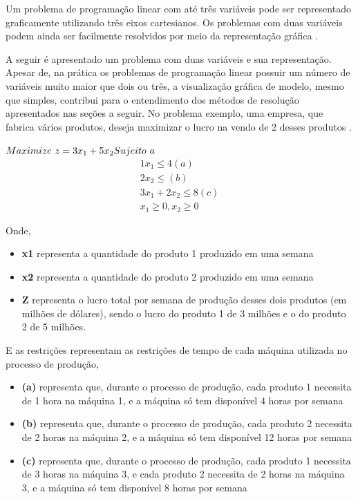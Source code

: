 Um problema de programação linear com até três variáveis pode ser representado graficamente utilizando três eixos cartesianos. Os problemas com duas variáveis podem ainda ser facilmente resolvidos por meio da representação gráfica \cite{Passos}. 

A seguir é apresentado um problema com duas variáveis e sua representação. Apesar de, na prática os problemas de programação linear possuir um número de variáveis muito maior que dois ou três, a visualização gráfica de modelo, mesmo que simples, contribui para o entendimento dos métodos de resolução apresentados nas seções a seguir.
No problema exemplo, uma empresa, que fabrica vários produtos, deseja maximizar o lucro na vendo de 2 desses produtos \cite{Hillier}.

$\\Maximize\ z=3x_{1}+5x_{2}\\
Sujeito\ a\\$
\begin{eqnarray*}
        1x_{1}\leq 4 (a)\\
              2x_{2}\leq (b)\\
        3x_{1}+2x_{2}\leq 8 (c)\\
         x_{1}\geq 0, x_{2}\geq 0
\end{eqnarray*}

Onde, 
\begin{itemize}
\item \textbf {x1} representa a quantidade do produto 1 produzido em uma semana
\item \textbf {x2} representa a quantidade do produto 2 produzido em uma semana
\item \textbf {Z} representa o lucro total por semana de produção desses dois produtos (em milhões de dólares), sendo o lucro do produto 1 de 3 milhões e o do produto 2 de 5 milhões.
\end{itemize}

E as restrições representam as restrições de tempo de cada máquina utilizada no processo de produção,
\begin{itemize}
\item \textbf {(a)} representa que, durante o processo de produção, cada produto 1 necessita de 1 hora na máquina 1, e a máquina só tem disponível 4 horas por semana
\item \textbf {(b)} representa que, durante o processo de produção, cada produto 2 necessita de 2 horas na máquina 2, e a máquina só tem disponível 12 horas por semana
\item \textbf {(c)} representa que, durante o processo de produção, cada produto 1 necessita de 3 horas na máquina 3, e cada produto 2 necessita de 2 horas na máquina 3, e a máquina só tem disponível 8 horas por semana
\end{itemize}

